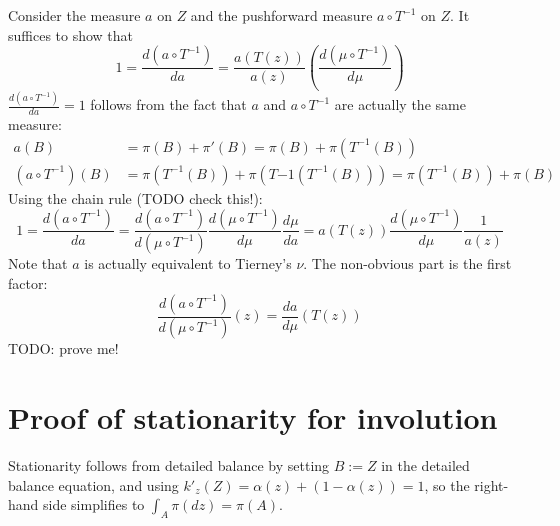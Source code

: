 \documentclass[twoside]{article}
\begin{document}
Consider the measure $a$ on $Z$ and the pushforward measure $a \circ T^{-1}$ on $Z$.
It suffices to show that
\[ 
1 = \frac{d (a \circ T^{-1})}{d a} = \frac{a(T(z))}{a(z)} \left( \frac{d (\mu \circ T^{-1})}{d \mu} \right)
\]
$\frac{d (a \circ T^{-1})}{d a} = 1$ follows from the fact that $a$ and $a \circ T^{-1}$ are actually the same measure:
\begin{align}
a(B) &= \pi(B) + \pi'(B) = \pi(B) + \pi(T^{-1}(B))\\
(a \circ T^{-1})(B) &= \pi(T^{-1}(B)) + \pi(T{-1}(T^{-1}(B))) = \pi(T^{-1}(B)) + \pi(B)
\end{align}
Using the chain rule (TODO check this!):
\[
1 = \frac{d (a \circ T^{-1})}{d a}
=   \frac{d (a \circ T^{-1})}{d (\mu \circ T^{-1})}
    \frac{d (\mu \circ T^{-1})}{d \mu}
    \frac{d \mu}{d a}
= a(T(z))  \frac{d (\mu \circ T^{-1})}{d \mu} \frac{1}{a(z)}
\]
Note that $a$ is actually equivalent to Tierney's $\nu$.
The non-obvious part is the first factor:
\[
\frac{d (a \circ T^{-1})}{d (\mu \circ T^{-1})}(z) = \frac{d a}{d \mu} (T(z))
\]
TODO: prove me!

\section{Proof of stationarity for involution}
Stationarity follows from detailed balance by setting $B := Z$ in the detailed balance equation, and using $k'_z(Z) = \alpha(z) + (1 - \alpha(z)) =1$, so the right-hand side simplifies to $\int_A \pi(dz) = \pi(A)$.
\end{document}
